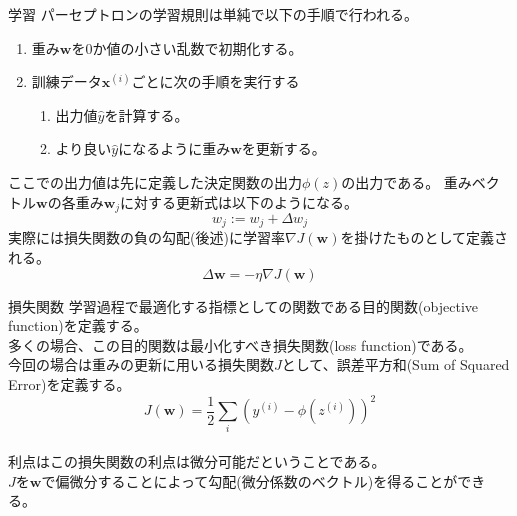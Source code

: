 \documentclass[aspectratio=169, dvipdfmx, 11pt]{beamer} %
\begin{document}
\begin{frame}{学習}
    パーセプトロンの学習規則は単純で以下の手順で行われる。
    \begin{enumerate}
        \item 重み\(\textbf{w}\)を0か値の小さい乱数で初期化する。
        \item 訓練データ\(\textbf{x}^{(i)}\)ごとに次の手順を実行する
        \begin{enumerate}
            \item 出力値\(\hat{y}\)を計算する。
            \item より良い\(\hat{y}\)になるように重み\(\textbf{w}\)を更新する。
        \end{enumerate}
    \end{enumerate}
    \vspace{1em}
    ここでの出力値は先に定義した決定関数の出力\(\phi(z)\)の出力である。
    重みベクトル\(\textbf{w}\)の各重み\(\textbf{w}_j\)に対する更新式は以下のようになる。
    \begin{equation*}
        w_j := w_j + \Delta w_j
    \end{equation*}
    実際には損失関数の負の勾配(後述)に学習率\(\nabla J(\textbf{w})\)を掛けたものとして定義される。
    \begin{equation*}
        \Delta \textbf{w} = - \eta \nabla J(\textbf{w})
    \end{equation*}
\end{frame}

\begin{frame}{損失関数}
    学習過程で最適化する指標としての関数である目的関数(objective function)を定義する。\\
    多くの場合、この目的関数は最小化すべき損失関数(loss function)である。 \\
    今回の場合は重みの更新に用いる損失関数\(J\)として、誤差平方和(Sum of Squared Error)を定義する。
    \vspace{1em}
    \begin{equation*}
        J(\textbf{w}) = \frac{1}{2}\sum_{i}^{}(y^{(i)} - \phi(z^{(i)}))^2
    \end{equation*}
    \\
    \vspace{1em}
    利点はこの損失関数の利点は微分可能だということである。 \\
    \(J\)を\(\textbf{w}\)で偏微分することによって勾配(微分係数のベクトル)を得ることができる。
\end{frame}
\end{document}
